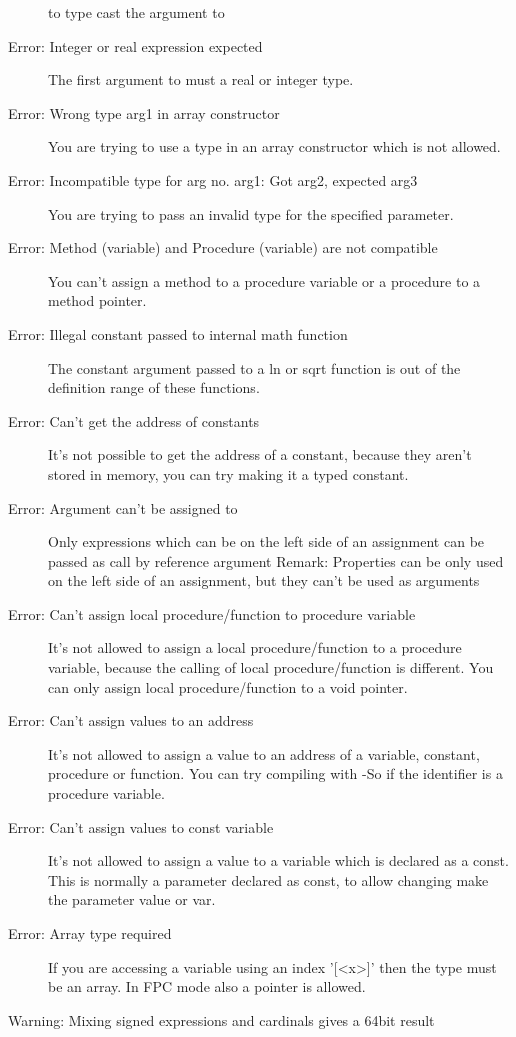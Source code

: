 \begin{description}
 to type cast the argument to 
\item [Error: Integer or real expression expected]
 The first argument to  must a real or integer type.
\item [Error: Wrong type arg1 in array constructor]
 You are trying to use a type in an array constructor which is not
 allowed.
\item [Error: Incompatible type for arg no. arg1: Got arg2, expected arg3]
 You are trying to pass an invalid type for the specified parameter.
\item [Error: Method (variable) and Procedure (variable) are not compatible]
 You can't assign a method to a procedure variable or a procedure to a
 method pointer.
\item [Error: Illegal constant passed to internal math function]
 The constant argument passed to a ln or sqrt function is out of
 the definition range of these functions.
\item [Error: Can't get the address of constants]
 It's not possible to get the address of a constant, because they
 aren't stored in memory, you can try making it a typed constant.
\item [Error: Argument can't be assigned to]
 Only expressions which can be on the left side of an
 assignment can be passed as call by reference argument
 Remark: Properties can be only
 used on the left side of an assignment, but they can't be used as arguments
\item [Error: Can't assign local procedure/function to procedure variable]
 It's not allowed to assign a local procedure/function to a
 procedure variable, because the calling of local procedure/function is
 different. You can only assign local procedure/function to a void pointer.
\item [Error: Can't assign values to an address]
 It's not allowed to assign a value to an address of a variable, constant,
 procedure or function. You can try compiling with -So if the identifier
 is a procedure variable.
\item [Error: Can't assign values to const variable]
 It's not allowed to assign a value to a variable which is declared
 as a const. This is normally a parameter declared as const, to allow
 changing make the parameter value or var.
\item [Error: Array type required]
 If you are accessing a variable using an index '[<x>]' then
 the type must be an array. In FPC mode also a pointer is allowed.
\item [Warning: Mixing signed expressions and cardinals gives a 64bit result]

\end{description}

